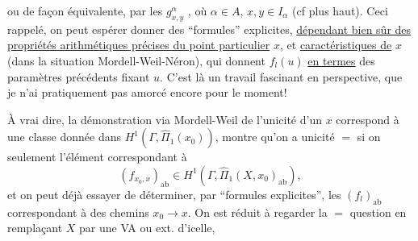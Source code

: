 ou de façon équivalente, par les $g^\alpha_{x,y}$ \inserted{$\in\unsure{\widehat\Pi_\alpha|\widehat\pi_\alpha}$}, où $\alpha\in A$, $x,y\in I_\alpha$ (cf plus haut). Ceci rappelé, on peut espérer donner des ``formules'' explicites, \uline{dépendant bien sûr des propriétés arithmétiques précises du point particulier} $x$, et \uline{caractéristiques de} $x$ (dans la situation Mordell-Weil-Néron), qui donnent $f_l(u)$ \uline{en termes} des paramètres précédents fixant $u$. C'est là un travail fascinant en perspective, que je n'ai pratiquement pas amorcé encore pour le moment!

À vrai dire, la démonstration via Mordell-Weil de l'unicité d'un $x$   correspond à une classe donnée dans $H^1(\Gamma,\widehat\Pi_1(x_0))$, montre qu'on a unicité $=$ si on   seulement l'élément correspondant à 
\[
\tag{34}(f_{x_0,x})_{\mathrm{ab}}\in H^1(\Gamma,\widehat\Pi_1(X,x_0)_{\mathrm{ab}}),
\]
et on peut déjà essayer de déterminer, par ``formules explicites'', les $(f_l)_{\mathrm{ab}}$ correspondant à des chemins $x_0\longrightarrow x$. On est réduit à regarder la $=$ question en remplaçant $X$ par une VA ou ext. d'icelle,

